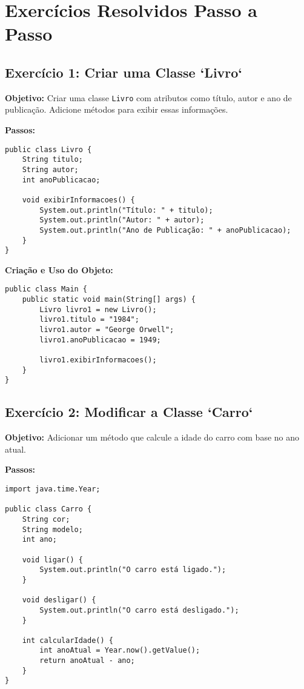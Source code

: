\documentclass[a4paper,12pt]{book}
\begin{document}
\section{Exercícios Resolvidos Passo a Passo}

\subsection{Exercício 1: Criar uma Classe `Livro`}

\textbf{Objetivo:} Criar uma classe \texttt{Livro} com atributos como título, autor e ano de publicação. Adicione métodos para exibir essas informações.

\textbf{Passos:}

\begin{verbatim}
public class Livro {
    String titulo;
    String autor;
    int anoPublicacao;

    void exibirInformacoes() {
        System.out.println("Título: " + titulo);
        System.out.println("Autor: " + autor);
        System.out.println("Ano de Publicação: " + anoPublicacao);
    }
}
\end{verbatim}

\textbf{Criação e Uso do Objeto:}

\begin{verbatim}
public class Main {
    public static void main(String[] args) {
        Livro livro1 = new Livro();
        livro1.titulo = "1984";
        livro1.autor = "George Orwell";
        livro1.anoPublicacao = 1949;

        livro1.exibirInformacoes();
    }
}
\end{verbatim}

\subsection{Exercício 2: Modificar a Classe `Carro`}

\textbf{Objetivo:} Adicionar um método que calcule a idade do carro com base no ano atual.

\textbf{Passos:}

\begin{verbatim}
import java.time.Year;

public class Carro {
    String cor;
    String modelo;
    int ano;

    void ligar() {
        System.out.println("O carro está ligado.");
    }

    void desligar() {
        System.out.println("O carro está desligado.");
    }

    int calcularIdade() {
        int anoAtual = Year.now().getValue();
        return anoAtual - ano;
    }
}
\end{verbatim}
\end{document}
